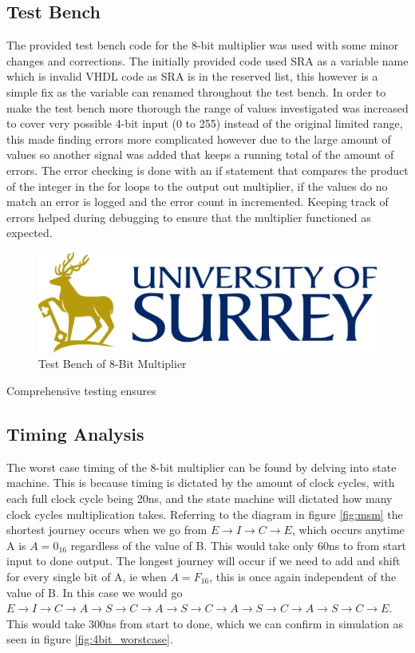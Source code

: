 \documentclass[11pt]{article}
\begin{document}
\subsection{Test Bench}
The provided test bench code for the 8-bit multiplier was used with some minor changes and corrections.
The initially provided code used SRA as a variable name which is invalid VHDL code as SRA is in the reserved list,
this however is a simple fix as the variable can renamed throughout the test bench.
In order to make the test bench more thorough the range of values investigated was increased to cover very possible 4-bit input (0 to 255) instead of the original limited range,
this made finding errors more complicated however due to the large amount of values so another signal was added that keeps a running total of the amount of errors.
The error checking is done with an if statement that compares the product of the integer in the for loops to the output out multiplier,
if the values do no match an error is logged and the error count in incremented. 
Keeping track of errors helped during debugging to ensure that the multiplier functioned as expected. 

\begin{figure}[H]        
    \centering
    \includegraphics[width=.5\textwidth]{Logo.png}
    \caption{Test Bench of 8-Bit Multiplier}
    \label{fig:4bit_testbench}
\end{figure} 

Comprehensive testing ensures

\subsection{Timing Analysis}

The worst case timing of the 8-bit multiplier can be found by delving into state machine. 
This is because timing is dictated by the amount of clock cycles, with each full clock cycle being 20ns, and the state machine will dictated how many clock cycles multiplication takes.
Referring to the diagram in figure \ref{fig:msm} the shortest journey occurs when we go from $E \rightarrow I \rightarrow C \rightarrow E$, which occurs anytime A is $A = 0_16$ regardless of the value of B.
This would take only 60ns to from start input to done output.
The longest journey will occur if we need to add and shift for every single bit of A, ie when $A = F_16$, this is once again independent of the value of B.
In this case we would go $E \rightarrow I \rightarrow C \rightarrow A \rightarrow S \rightarrow C \rightarrow A \rightarrow S \rightarrow C \rightarrow A \rightarrow S \rightarrow C \rightarrow A \rightarrow S \rightarrow C \rightarrow E$.
This would take 300ns from start to done, which we can confirm in simulation as seen in figure \ref{fig:4bit_worstcase}.
\end{document}

